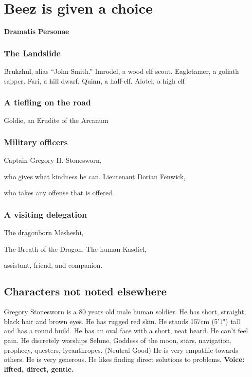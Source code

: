 \section{Beez is given a choice}
\textbf{\LARGE Dramatis Personae}
\begin{multicols}{2}

\subsubsection{The Landslide}
Brukzhul, alias ``John Smith.'' \newline
Imrodel, a wood elf scout. \newline
Eagletamer, a goliath sapper. \newline
Fari, a hill dwarf. \newline
Quinn, a half-elf. \newline
Alotel, a high elf

\subsubsection{A tiefling on the road}
Goldie, an Erudite of the Arcanum

\subsubsection{Military officers}
Captain Gregory H. Stonesworn,\par who gives what kindness he can. \newline
Lieutenant Dorian Fenwick,\par who takes any offense that is offered.

\subsubsection{A visiting delegation}
The dragonborn Mesheshi,\par The Breath of the Dragon. \newline
The human Kasdiel,\par assistant, friend, and companion. \newline
\end{multicols}
\noindent
\hrulefill

\subsection*{Characters not noted elsewhere}

Gregory Stonesworn is a 80 years old male human soldier.
He has short, straight, black hair and brown eyes.
He has rugged red skin.
He stands 157cm (5'1") tall and has a round build.
He has an oval face with a short, neat beard.
He can't feel pain.
He discretely worships Selune, Goddess of the moon, stars, navigation, prophecy, questers, lycanthropes. (Neutral Good)
He is very empathic towards others.
He is very generous.
He likes finding direct solutions to problems.
\textbf{Voice: lifted, direct, gentle.}

